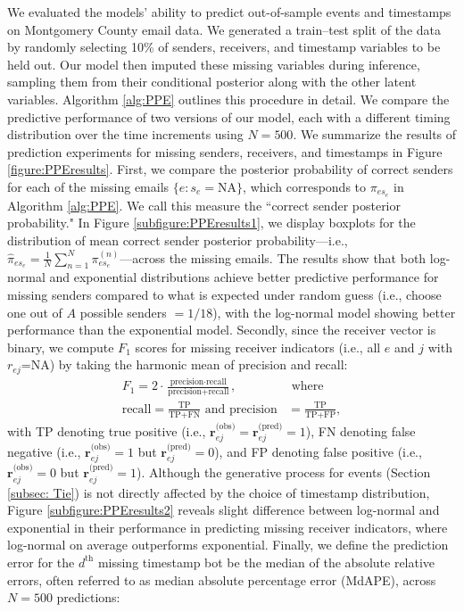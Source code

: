\documentclass[ba]{imsart}
\numberwithin{equation}{section}
\theoremstyle{plain}
\begin{document}
	We evaluated the models' ability to predict out-of-sample events and timestamps on Montgomery County email data. We generated a train--test split of the data by randomly selecting 10\% of senders, receivers, and timestamp variables to be held out. Our model then imputed these missing variables during inference, sampling them from their conditional posterior along with the other latent variables. Algorithm \ref{alg:PPE} outlines this procedure in detail. We compare the predictive performance of two versions of our model, each with a different timing distribution over the time increments using $N=500$. We summarize the results of prediction experiments for missing senders, receivers, and timestamps in Figure \ref{figure:PPEresults}. First, we compare the posterior probability of correct senders for each of the missing emails $\{e:s_e=\mbox{NA}\}$, which corresponds to $\pi_{es_e}$ in Algorithm \ref{alg:PPE}. We call this measure the ``correct sender posterior probability." In Figure \ref{subfigure:PPEresults1}, we display boxplots for the distribution of mean correct sender posterior probability---i.e., $\hat{\pi}_{es_{e}} = \frac{1}{N}\sum_{n=1}^N \pi^{(n)}_{es_{e}}$---across the missing emails. The results show that both log-normal and exponential distributions achieve better predictive performance for missing senders compared to what is expected under random guess (i.e., choose one out of $A$ possible senders $=1/18$), with the log-normal model showing better performance than the exponential model. Secondly, since the receiver vector is binary, we compute $F_1$ scores for missing receiver indicators (i.e., all $e$ and $j$ with $r_{ej}$=NA) by taking the harmonic mean of precision and recall:
	\begin{equation}
		\begin{aligned}
			F_1 =2\cdot\frac{\mbox{precision}\cdot \mbox{recall}}{\mbox{precision}+ \mbox{recall}}, &\mbox{ where } \\
			\mbox{recall}  = \frac{\mbox{TP}}{\mbox{TP+FN}} \mbox{ and } \mbox{precision} & =\frac{\mbox{TP}}{\mbox{TP+FP}},
		\end{aligned}
	\end{equation}
with TP denoting true positive (i.e., $\boldsymbol{r}^{\textrm{(obs)}}_{ej}=\boldsymbol{r}^{\textrm{(pred)}}_{ej}=1$), FN denoting false negative (i.e., $\boldsymbol{r}^{\textrm{(obs)}}_{ej}=1$ but $\boldsymbol{r}^{\textrm{(pred)}}_{ej}=0$), and FP denoting false positive (i.e., $\boldsymbol{r}^{\textrm{(obs)}}_{ej}=0$ but $\boldsymbol{r}^{\textrm{(pred)}}_{ej}=1$). Although the generative process for events (Section \ref{subsec: Tie}) is not directly affected by the choice of timestamp distribution, Figure \ref{subfigure:PPEresults2} reveals slight difference between log-normal and exponential in their performance in predicting missing receiver indicators, where log-normal on average outperforms exponential. Finally, we define the prediction error for the $d^{\textrm{th}}$ missing timestamp bot be the median of the absolute relative errors, often referred to as median absolute percentage error (MdAPE), across $N=500$ predictions:
\end{document}
